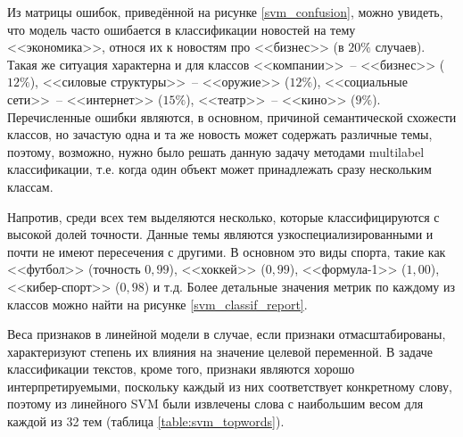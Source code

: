 \documentclass[a4paper, 14pt]{extarticle}
\begin{document}
Из матрицы ошибок, приведённой на рисунке \ref{svm_confusion}, можно увидеть, что модель часто ошибается в классификации новостей на тему
<<экономика>>, относя их к новостям про <<бизнес>> (в $20\%$ случаев). Такая же ситуация характерна и для классов <<компании>>~-- 
<<бизнес>> ($12\%$), <<силовые структуры>>~-- <<оружие>> ($12\%$),  <<социальные сети>>~-- <<интернет>> ($15\%$), <<театр>>~-- 
<<кино>> ($9\%$). Перечисленные ошибки являются, в основном, причиной семантической схожести классов, но зачастую одна и та же 
новость может содержать различные темы, поэтому, возможно, нужно было решать данную задачу методами multilabel классификации, т.е. 
когда один объект может принадлежать сразу
нескольким классам.

Напротив, среди всех тем выделяются несколько, которые классифицируются с высокой долей точности. Данные темы 
являются узкоспециализированными и почти не имеют пересечения с другими. В основном это виды спорта, такие как <<футбол>> (точность 
$0,99$), <<хоккей>> ($0,99$), <<формула-1>> ($1,00$), <<кибер-спорт>> ($0,98$) и т.д. Более детальные
значения метрик по каждому из классов можно найти на рисунке \ref{svm_classif_report}.

Веса признаков в линейной модели в случае, если признаки отмасштабированы, характеризуют степень их влияния на значение целевой 
переменной. В задаче классификации текстов, кроме того, признаки являются хорошо интерпретируемыми, поскольку каждый из них 
соответствует конкретному слову, поэтому из линейного SVM были извлечены слова с наибольшим весом для каждой из 32 тем (таблица \ref{table:svm_topwords}). 
%
%
%
%
%
%
%
%
\end{document}
